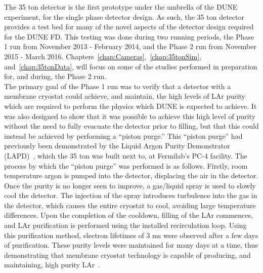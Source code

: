 The 35 ton detector is the first prototype under the umbrella of the DUNE experiment, for the single phase detector design. As such, the 35 ton detector provides a test bed for many of the novel aspects of the detector design required for the DUNE FD. This testing was done during two running periods, the Phase 1 run from November 2013 - February 2014, and the Phase 2 run from November 2015 - March 2016. Chapters~\ref{chap:Cameras},~\ref{chap:35tonSim}, and~\ref{chap:35tonData}, will focus on some of the studies performed in preparation for, and during, the Phase 2 run. \\ 

The primary goal of the Phase 1 run was to verify that a detector with a membrane cryostat could achieve, and maintain, the high levels of LAr purity which are required to perform the physics which DUNE is expected to achieve. It was also designed to show that it was possible to achieve this high level of purity without the need to fully evacuate the detector prior to filling, but that this could instead be achieved by performing a ``piston purge.'' This ``piston purge'' had previously been demonstrated by the Liquid Argon Purity Demonstrator (LAPD)~\citep{LAPD}, which the 35 ton was built next to, at Fermilab's PC-4 facility. The process by which the ``piston purge'' was performed is as follows. Firstly, room temperature argon is pumped into the detector, displacing the air in the detector. Once the purity is no longer seen to improve, a gas/liquid spray is used to slowly cool the detector. The injection of the spray introduces turbulence into the gas in the detector, which causes the entire cryostat to cool, avoiding large temperature differences. Upon the completion of the cooldown, filling of the LAr commences, and LAr purification is performed using the installed recirculation loop. Using this purification method, electron lifetimes of 3 ms were observed after a few days of purification. These purity levels were maintained for many days at a time, thus demonstrating that membrane cryostat technology is capable of producing, and maintaining, high purity LAr~\citep{35tonMontanari, 35tonHahn}. \\

